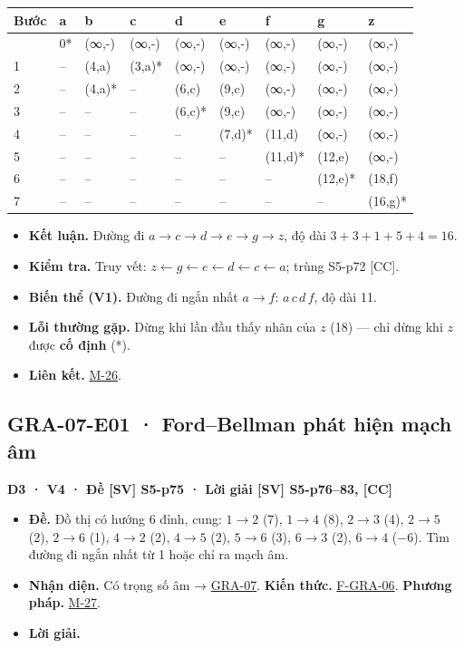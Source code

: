 \documentclass[
  10pt,
  twoside,openany]{book}
\providecommand{\tightlist}{%
  \setlength{\itemsep}{0pt}\setlength{\parskip}{0pt}}
\begin{document}
\begin{longtable}[]{@{}lllllllll@{}}
\toprule\noalign{}
Bước & a & b & c & d & e & f & g & z \\
\midrule\noalign{}
\endhead
\bottomrule\noalign{}
\endlastfoot
0 & 0* & (∞,-) & (∞,-) & (∞,-) & (∞,-) & (∞,-) & (∞,-) & (∞,-) \\
1 & -- & (4,a) & (3,a)* & (∞,-) & (∞,-) & (∞,-) & (∞,-) & (∞,-) \\
2 & -- & (4,a)* & -- & (6,c) & (9,c) & (∞,-) & (∞,-) & (∞,-) \\
3 & -- & -- & -- & (6,c)* & (9,c) & (∞,-) & (∞,-) & (∞,-) \\
4 & -- & -- & -- & -- & (7,d)* & (11,d) & (∞,-) & (∞,-) \\
5 & -- & -- & -- & -- & -- & (11,d)* & (12,e) & (∞,-) \\
6 & -- & -- & -- & -- & -- & -- & (12,e)* & (18,f) \\
7 & -- & -- & -- & -- & -- & -- & -- & (16,g)* \\
\end{longtable}

\begin{itemize}
\tightlist
\item
  \textbf{Kết luận.} Đường đi \(a\to c\to d\to e\to g\to z\), độ dài
  \(3+3+1+5+4=16\).
\item
  \textbf{Kiểm tra.} Truy vết:
  \(z\leftarrow g\leftarrow e\leftarrow d\leftarrow c\leftarrow a\);
  trùng S5-p72 {[}CC{]}.
\item
  \textbf{Biến thể (V1).} Đường đi ngắn nhất \(a\to f\): \(a\,c\,d\,f\),
  độ dài 11.
\item
  \textbf{Lỗi thường gặp.} Dừng khi lần đầu thấy nhãn của \(z\) (18) ---
  chỉ dừng khi \(z\) được \textbf{cố định} (*).
\item
  \textbf{Liên kết.} \protect\hyperlink{M-26}{M-26}.
\end{itemize}

\hypertarget{GRA-07-E01}{%
\subsection{GRA-07-E01 · Ford--Bellman phát hiện mạch
âm}\label{GRA-07-E01}}

\textbf{D3 · V4 · Đề {[}SV{]} S5-p75 · Lời giải {[}SV{]} S5-p76--83,
{[}CC{]}}

\begin{itemize}
\tightlist
\item
  \textbf{Đề.} Đồ thị có hướng 6 đỉnh, cung: \(1\to2\) (7), \(1\to4\)
  (8), \(2\to3\) (4), \(2\to5\) (2), \(2\to6\) (1), \(4\to2\) (2),
  \(4\to5\) (2), \(5\to6\) (3), \(6\to3\) (2), \(6\to4\) (−6). Tìm đường
  đi ngắn nhất từ 1 hoặc chỉ ra mạch âm.
\item
  \textbf{Nhận diện.} Có trọng số âm →
  \protect\hyperlink{GRA-07}{GRA-07}. \textbf{Kiến thức.}
  \protect\hyperlink{F-GRA-06}{F-GRA-06}. \textbf{Phương pháp.}
  \protect\hyperlink{M-27}{M-27}.
\item
  \textbf{Lời giải.}
\end{itemize}
\end{document}
